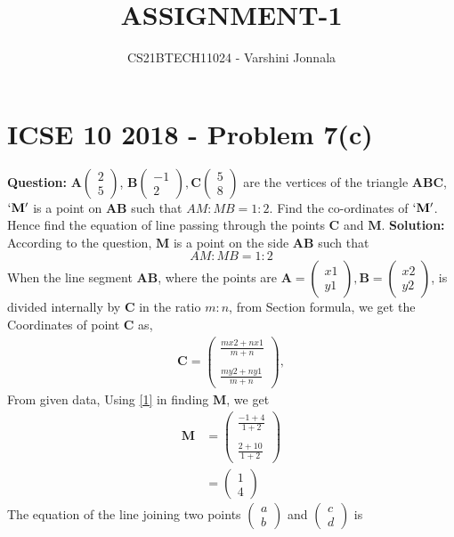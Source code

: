 \documentclass[journal,12pt,twocolumn]{IEEEtran}
\begin{document}
\newcommand{\question}{\noindent \textbf{Question: }}
\newcommand{\solution}{\noindent \textbf{Solution: }}
\newcommand{\myvec}[1]{\ensuremath{\begin{pmatrix}#1\end{pmatrix}}}

\let\vec\mathbf

\title{ASSIGNMENT-1}
\author{CS21BTECH11024 - Varshini  Jonnala}	
\maketitle
\bigskip
\section*{ICSE 10 2018 - Problem 7(c)}

\question $\vec{A}\myvec{2\\5}$, $\vec{B}\myvec{-1\\2}, \vec{C}\myvec{5\\8}$ are the vertices of the triangle $\vec{ABC}$, $\vec{`M'}$ is a point on $\vec{AB}$ such that $AM:MB = 1:2$. Find the co-ordinates of $\vec{`M'}$. Hence find the equation of line passing through the points $\vec{C}$ and $\vec{M}$.
\newline \newline
\solution According to the question, $\vec{M}$ is a point on the side $\vec{AB}$ such that $$AM : MB = 1 : 2$$
 When the line segment $\vec{AB}$, where the points are $\vec{A}=\myvec{x1\\y1}, \vec{B}=\myvec{x2\\y2}$, is divided internally by $\vec{C}$ in the ratio $m:n$, from Section formula,
 we get the Coordinates of point $\vec{C}$ as,
\begin{align} 
\vec{C} = \myvec{\frac{mx2+nx1}{m+n}\\\\ \frac{my2+ny1}{m+n}},\label{1}
\end{align}
From given data, Using \eqref{1} in finding $\vec{M}$, we get
\begin{align}
    \vec{M} &= \myvec{\frac{-1+4}{1+2}\\\\ \frac{2+10}{1+2}}\\  \label{3}
   &= \myvec{1\\4}
\end{align}\newline
The equation of the line joining two points \myvec{a\\b} and \myvec{c\\d} is 
\end{document}
